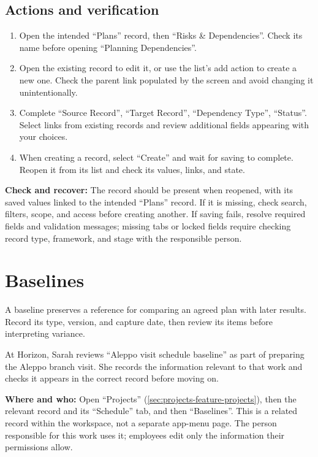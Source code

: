 \subsection{Actions and verification}
\begin{enumerate}
\item Open the intended “Plans” record, then “Risks \& Dependencies”. Check its name before opening “Planning Dependencies”.
\item Open the existing record to edit it, or use the list's add action to create a new one. Check the parent link populated by the screen and avoid changing it unintentionally.
\item Complete “Source Record”, “Target Record”, “Dependency Type”, “Status”. Select links from existing records and review additional fields appearing with your choices.
\item When creating a record, select “Create” and wait for saving to complete. Reopen it from its list and check its values, links, and state.
\end{enumerate}

\textbf{Check and recover:} The record should be present when reopened, with its saved values linked to the intended “Plans” record. If it is missing, check search, filters, scope, and access before creating another. If saving fails, resolve required fields and validation messages; missing tabs or locked fields require checking record type, framework, and stage with the responsible person.

\clearpage
\section{Baselines}
\label{sec:projects-feature-baselines}

A baseline preserves a reference for comparing an agreed plan with later results. Record its type, version, and capture date, then review its items before interpreting variance.

\begin{rcnote}
At Horizon, Sarah reviews “Aleppo visit schedule baseline” as part of preparing the Aleppo branch visit. She records the information relevant to that work and checks it appears in the correct record before moving on.
\end{rcnote}

\textbf{Where and who:} Open “Projects” (\ref{sec:projects-feature-projects}), then the relevant record and its “Schedule” tab, and then “Baselines”. This is a related record within the workspace, not a separate app-menu page. The person responsible for this work uses it; employees edit only the information their permissions allow.

